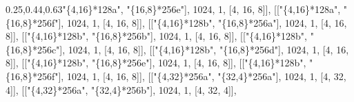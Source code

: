 \documentclass[
  10pt,
  letterpaper,
]{article}
\newenvironment{Shaded}{}{}
\newcommand{\FloatTok}[1]{\textcolor[rgb]{0.25,0.63,0.44}{#1}}
\newcommand{\NormalTok}[1]{#1}
\newcommand{\OperatorTok}[1]{\textcolor[rgb]{0.40,0.40,0.40}{#1}}
\newcommand{\StringTok}[1]{\textcolor[rgb]{0.25,0.44,0.63}{#1}}
\begin{document}
\begin{Shaded}
\begin{Highlighting}[]
\NormalTok{[[}\StringTok{"\{4,16\}*128a"}\OperatorTok{,} \StringTok{"\{16,8\}*256e"}\NormalTok{]}\OperatorTok{,} \FloatTok{1024}\OperatorTok{,} \FloatTok{1}\OperatorTok{,}\NormalTok{ [}\FloatTok{4}\OperatorTok{,} \FloatTok{16}\OperatorTok{,} \FloatTok{8}\NormalTok{]]}\OperatorTok{,}
\NormalTok{[[}\StringTok{"\{4,16\}*128a"}\OperatorTok{,} \StringTok{"\{16,8\}*256f"}\NormalTok{]}\OperatorTok{,} \FloatTok{1024}\OperatorTok{,} \FloatTok{1}\OperatorTok{,}\NormalTok{ [}\FloatTok{4}\OperatorTok{,} \FloatTok{16}\OperatorTok{,} \FloatTok{8}\NormalTok{]]}\OperatorTok{,}
\NormalTok{[[}\StringTok{"\{4,16\}*128b"}\OperatorTok{,} \StringTok{"\{16,8\}*256a"}\NormalTok{]}\OperatorTok{,} \FloatTok{1024}\OperatorTok{,} \FloatTok{1}\OperatorTok{,}\NormalTok{ [}\FloatTok{4}\OperatorTok{,} \FloatTok{16}\OperatorTok{,} \FloatTok{8}\NormalTok{]]}\OperatorTok{,}
\NormalTok{[[}\StringTok{"\{4,16\}*128b"}\OperatorTok{,} \StringTok{"\{16,8\}*256b"}\NormalTok{]}\OperatorTok{,} \FloatTok{1024}\OperatorTok{,} \FloatTok{1}\OperatorTok{,}\NormalTok{ [}\FloatTok{4}\OperatorTok{,} \FloatTok{16}\OperatorTok{,} \FloatTok{8}\NormalTok{]]}\OperatorTok{,}
\NormalTok{[[}\StringTok{"\{4,16\}*128b"}\OperatorTok{,} \StringTok{"\{16,8\}*256c"}\NormalTok{]}\OperatorTok{,} \FloatTok{1024}\OperatorTok{,} \FloatTok{1}\OperatorTok{,}\NormalTok{ [}\FloatTok{4}\OperatorTok{,} \FloatTok{16}\OperatorTok{,} \FloatTok{8}\NormalTok{]]}\OperatorTok{,}
\NormalTok{[[}\StringTok{"\{4,16\}*128b"}\OperatorTok{,} \StringTok{"\{16,8\}*256d"}\NormalTok{]}\OperatorTok{,} \FloatTok{1024}\OperatorTok{,} \FloatTok{1}\OperatorTok{,}\NormalTok{ [}\FloatTok{4}\OperatorTok{,} \FloatTok{16}\OperatorTok{,} \FloatTok{8}\NormalTok{]]}\OperatorTok{,}
\NormalTok{[[}\StringTok{"\{4,16\}*128b"}\OperatorTok{,} \StringTok{"\{16,8\}*256e"}\NormalTok{]}\OperatorTok{,} \FloatTok{1024}\OperatorTok{,} \FloatTok{1}\OperatorTok{,}\NormalTok{ [}\FloatTok{4}\OperatorTok{,} \FloatTok{16}\OperatorTok{,} \FloatTok{8}\NormalTok{]]}\OperatorTok{,}
\NormalTok{[[}\StringTok{"\{4,16\}*128b"}\OperatorTok{,} \StringTok{"\{16,8\}*256f"}\NormalTok{]}\OperatorTok{,} \FloatTok{1024}\OperatorTok{,} \FloatTok{1}\OperatorTok{,}\NormalTok{ [}\FloatTok{4}\OperatorTok{,} \FloatTok{16}\OperatorTok{,} \FloatTok{8}\NormalTok{]]}\OperatorTok{,}
\NormalTok{[[}\StringTok{"\{4,32\}*256a"}\OperatorTok{,} \StringTok{"\{32,4\}*256a"}\NormalTok{]}\OperatorTok{,} \FloatTok{1024}\OperatorTok{,} \FloatTok{1}\OperatorTok{,}\NormalTok{ [}\FloatTok{4}\OperatorTok{,} \FloatTok{32}\OperatorTok{,} \FloatTok{4}\NormalTok{]]}\OperatorTok{,}
\NormalTok{[[}\StringTok{"\{4,32\}*256a"}\OperatorTok{,} \StringTok{"\{32,4\}*256b"}\NormalTok{]}\OperatorTok{,} \FloatTok{1024}\OperatorTok{,} \FloatTok{1}\OperatorTok{,}\NormalTok{ [}\FloatTok{4}\OperatorTok{,} \FloatTok{32}\OperatorTok{,} \FloatTok{4}\NormalTok{]]}\OperatorTok{,}

\end{Highlighting}
\end{Shaded}
\end{document}
